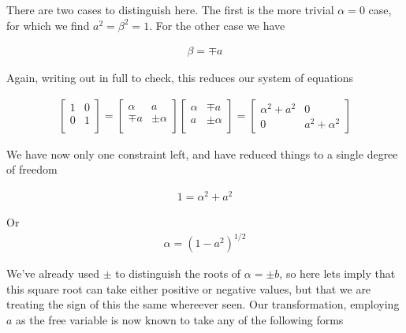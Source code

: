 There are two cases to distinguish here.  The first is the more trivial $\alpha = 0$ case, for which we find $a^2 = \beta^2 = 1$.  For the other case we have

\begin{align}\label{eqn:quadratricForm:voo13}
\beta = \mp a
\end{align}

Again, writing out in full to check, this reduces our system of equations

\begin{align}\label{eqn:quadratricForm:voo14}
\begin{bmatrix}
1 & 0 \\
0 & 1 \\
\end{bmatrix}
=
\begin{bmatrix}
\alpha & a     \\
\mp a  & \pm \alpha \\
\end{bmatrix}
\begin{bmatrix}
\alpha & \mp a \\
a      & \pm \alpha \\
\end{bmatrix}
= 
\begin{bmatrix}
\alpha^2 + a^2 & 0 \\
0 & a^2 + \alpha^2
\end{bmatrix}
\end{align}

We have now only one constraint left, and have reduced things to a single degree of freedom

\begin{align}\label{eqn:quadratricForm:voo15}
1 = \alpha^2 + a^2 
\end{align}

Or
\begin{align}\label{eqn:quadratricForm:voo16}
\alpha = (1 - a^2)^{1/2}
\end{align}

We've already used $\pm$ to distinguish the roots of $\alpha = \pm b$, so here lets imply that this square root can take either positive or negative values, but that we are treating the sign of this the same whereever seen.  Our transformation, employing $a$ as the free variable is now known to take any of the following forms

